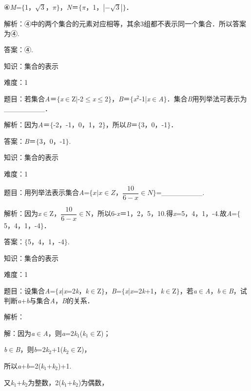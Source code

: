 \documentclass{article} %
\begin{document}
④\textit{M}=$\mathrm{\{}$1，$\sqrt{3}$，$\pi$$\mathrm{\}}$，\textit{N}＝$\mathrm{\{}$$\pi$，1，$|-\sqrt{3}|$$\mathrm{\}}$．

解析：④中的两个集合的元素对应相等，其余3组都不表示同一个集合．所以答案为④.

答案：④.

知识：集合的表示

难度：1

题目：若集合\textit{A}＝$\mathrm{\{}$\textit{x}$\mathrm{\in}$Z|-2$\mathrm{\le}$\textit{x}$\mathrm{\le}$2$\mathrm{\}}$，\textit{B}＝$\mathrm{\{}$\textit{x}${}^{2}$-1|\textit{x}$\mathrm{\in}$\textit{A}$\mathrm{\}}$．集合\textit{B}用列举法可表示为\_\_\_\_\_\_\_\_．

解析：因为\textit{A}＝$\mathrm{\{}$-2，-1，0，1，2$\mathrm{\}}$，所以\textit{B}＝$\mathrm{\{}$3，0，-1$\mathrm{\}}$．

答案：\textit{B}＝$\mathrm{\{}$3，0，-1$\mathrm{\}}$.

知识：集合的表示

难度：1

题目：用列举法表示集合\textit{A}=$\mathrm{\{}x|x\mathrm{\in}Z$，$\dfrac{10}{6-x}\mathrm{\in}N
\mathrm{\}}$=\_\_\_\_\_\_\_\_.

解析：因为\textit{x}$\mathrm{\in}$Z，$\dfrac{10}{6-x}\mathrm{\in}$N，所以6-\textit{x}＝1，2，5，10.得\textit{x}=5，4，1，-4.故\textit{A}=$\mathrm{\{}$5，4，1，-4$\mathrm{\}}$．

答案：$\mathrm{\{}$5，4，1，-4$\mathrm{\}}$.

知识：集合的表示

难度：1

题目：设集合\textit{A}=$\mathrm{\{}$\textit{x}|\textit{x}=2\textit{k}，\textit{k}$\mathrm{\in}$Z$\mathrm{\}}$，\textit{B}=$\mathrm{\{}$\textit{x}|\textit{x}=2\textit{k}+1，\textit{k}$\mathrm{\in}$Z$\mathrm{\}}$，若\textit{a}$\mathrm{\in}$\textit{A}，\textit{b}$\mathrm{\in}$\textit{B}，试判断\textit{a}+\textit{b}与集合\textit{A}，\textit{B}的关系．

解析：

解：因为\textit{a}$\mathrm{\in}$\textit{A}，则\textit{a}=2\textit{k}${}_{1}$(\textit{k}${}_{1}$$\mathrm{\in}$Z)；

\textit{b}$\mathrm{\in}$\textit{B}，则\textit{b}=2\textit{k}${}_{2}$+1(\textit{k}${}_{2}$$\mathrm{\in}$Z)，

所以\textit{a}+\textit{b}=2(\textit{k}${}_{1}$+\textit{k}${}_{2}$)+1.

又\textit{k}${}_{1}$+\textit{k}${}_{2}$为整数，2(\textit{k}${}_{1}$+\textit{k}${}_{2}$)为偶数，
\end{document}
